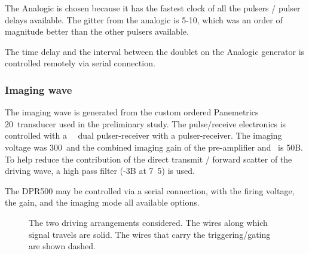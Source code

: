 The Analogic is chosen because it has the fastest clock of all the pulsers / pulser delays available.
The gitter from the analogic is  5-10\nano\second, which was an order of magnitude better than the other pulsers available.


The time delay and the interval between the doublet
on the Analogic generator is controlled remotely via serial connection.


\subsubsection{Imaging wave}
The imaging wave is generated from the custom ordered Panemetrics \unit{20}\mega\hertz\
transducer used in the preliminary study.
The pulse/receive electronics is controlled 
with a \JsrUltrasonics\ \ dual pulser-receiver
with a  pulser-receiver.
The imaging voltage was \unit{300}\volt\ and the combined imaging gain 
of the pre-amplifier and \DPR500\ is \unit{50}\deci B.
To help reduce the contribution of the direct transmit / forward scatter of
the driving wave, a high pass filter (-\unit{3}\deci B at \unit{7.5}\mega\hertz)
is used.

The DPR500 may be controlled via a serial connection,
with the  firing voltage, the gain,
and the imaging mode all available options.



\begin{centering}
\begin{figure}[h]%
   \hspace{.3in}
   \caption{
     The two driving arrangements considered.
     The wires along which signal travels are solid.
     The wires that carry the triggering/gating are shown dashed.
   }
   \label{fig:arrangements}
\end{figure}
\end{centering}

